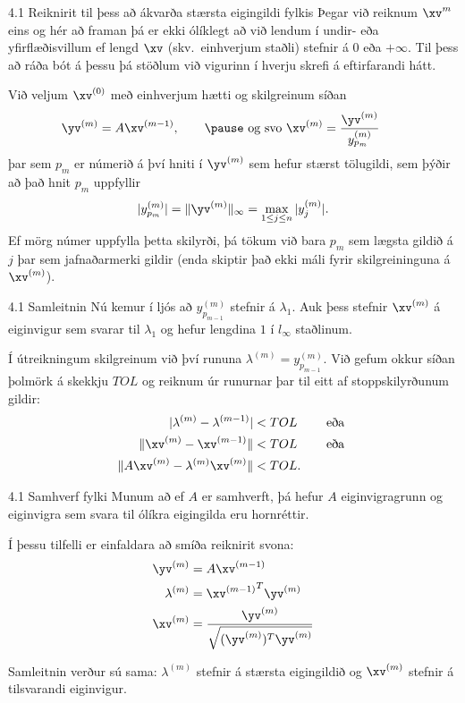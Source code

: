 \begin{frame}{4.1 Reiknirit til þess að ákvarða stærsta eigingildi fylkis} 
Þegar við reiknum $\xv^{m}$ eins og hér að framan þá er ekki ólíklegt að 
við lendum í undir- eða yfirflæðisvillum ef lengd $\xv$ (skv.~einhverjum staðli)
stefnir á 0 eða $+\infty$. Til þess að ráða bót á þessu þá stöðlum við vigurinn
í hverju skrefi á eftirfarandi hátt.

\pause

\smallskip
Við veljum $\xv^{(0)}$ með einhverjum hætti og skilgreinum síðan
$$
\yv^{(m)}=A\xv^{(m-1)}, \qquad \pause \text{ og svo }
\xv^{(m)}=\dfrac{\yv^{(m)}}{y_{p_m}^{(m)}} \qquad 
$$
\pause
þar sem $p_m$ er númerið á því hniti í $\yv^{(m)}$ sem hefur stærst
tölugildi, sem þýðir að það hnit $p_m$ uppfyllir
$$
|y_{p_m}^{(m)}|=\|\yv^{(m)}\|_\infty=\max_{1\leq j\leq n}|y_j^{(m)}|.
$$
\pause
Ef mörg númer uppfylla þetta skilyrði, þá tökum við bara $p_m$ sem
lægsta gildið á $j$ þar sem jafnaðarmerki gildir \pause
(enda skiptir það ekki máli fyrir skilgreininguna á $\xv^{(m)}$).
\end{frame}

\begin{frame}{4.1 Samleitnin} 
Nú kemur í ljós að 
$y_{p_{m-1}}^{(m)}$ stefnir á $\lambda_1$. 
Auk þess stefnir $\xv^{(m)}$ á eiginvigur sem svarar til $\lambda_1$ og hefur 
lengdina $1$ í $l_\infty$ staðlinum.

\pause
\smallskip
Í útreikningum skilgreinum við því rununa
$\lambda^{(m)}=y_{p_{m-1}}^{(m)}$.
Við gefum okkur síðan þolmörk á skekkju $TOL$ og reiknum úr runurnar
þar til eitt af stoppskilyrðunum gildir: 
\begin{align*}
|\lambda^{(m)}-\lambda^{(m-1)}|&<TOL \qquad \text{ eða } \\
\|\xv^{(m)}-\xv^{(m-1)}\|&<TOL \qquad \text { eða } \\
\|A\xv^{(m)}-\lambda^{(m)}\xv^{(m)}\|&<TOL.
\end{align*}
\end{frame}

\begin{frame}{4.1 Samhverf fylki} 
Munum að ef $A$ er samhverft, þá hefur $A$ eiginvigragrunn og
eiginvigra sem svara til ólíkra eigingilda eru hornréttir. 

\pause
\smallskip
Í þessu tilfelli er einfaldara að smíða reiknirit svona:
\begin{align*}
  \yv^{(m)}&=A\xv^{(m-1)}\\
\lambda^{(m)}&={\xv^{(m-1)}}^T\yv^{(m)}\\
\xv^{(m)}&= \frac{\yv^{(m)}}{\sqrt{(\yv^{(m)})^T\yv^{(m)}}}
\end{align*}

\pause
Samleitnin verður sú sama:  $\lambda^{(m)}$ stefnir á stærsta
eigingildið og $\xv^{(m)}$ stefnir á tilsvarandi eiginvigur.
\end{frame}


